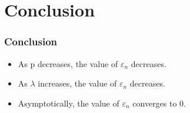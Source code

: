\documentclass{beamer}
\begin{document}
\section{Conclusion}
\begin{frame}[fragile]
\frametitle{Conclusion}

\begin{itemize}
\item As p decreases, the value of $\varepsilon_n$ decreases.

\item As $\lambda$ increases, the value of $\varepsilon_n$ decreases.

\item Asymptotically, the value of $\varepsilon_n$ converges to 0.

\end{itemize}
\end{frame}
\end{document}
